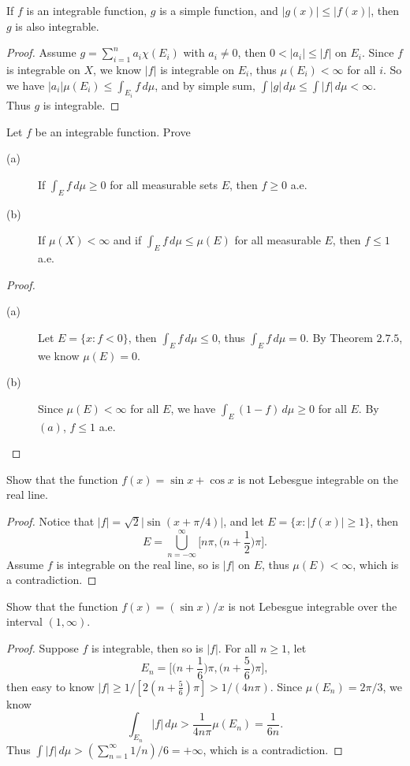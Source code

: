 \begin{pro}%
	If $f$ is an integrable function, $g$ is a simple function, and $|g(x)|\leq |f(x)|$, then $g$ is also integrable.
\end{pro}
\begin{proof}
	Assume $g=\sum_{i=1}^n a_i\chi(E_i)$ with $a_i\neq 0$, then $0<|a_i|\leq |f|$ on $E_i$. Since $f$ is integrable on $X$, we know $|f|$ is integrable on $E_i$, thus $\mu(E_i)<\infty$ for all $i$. So we have $|a_i|\mu(E_i)\leq \int_{E_i} f\,d\mu$, and by simple sum, $\int |g|\,d\mu\leq\int |f|\,d\mu<\infty$. Thus $g$ is integrable.
\end{proof}

\begin{pro}%
	Let $f$ be an integrable function. Prove
	\begin{description}
	\item[(a)] If $\int_E f\,d\mu\geq 0$ for all measurable sets $E$, then $f\geq 0$ a.e.
	\item[(b)] If $\mu(X)<\infty$ and if $\int_E f\,d\mu\leq \mu(E)$ for all measurable $E$, then $f\leq 1$ a.e.
	\end{description}
\end{pro}
\begin{proof}
	\begin{description}
	\item[(a)] Let $E=\{x\colon f<0\}$, then $\int_E f\,d\mu\leq 0$, thus $\int_E f\,d\mu=0$. By Theorem $2.7.5$, we know $\mu(E)=0$.
	\item[(b)] Since $\mu(E)<\infty$ for all $E$, we have $\int_E (1-f)\,d\mu\geq 0$ for all $E$. By $(a)$, $f\leq 1$ a.e.
	\end{description}
\end{proof}

\begin{pro}%
	Show that the function $f(x)=\sin x+\cos x$ is not Lebesgue integrable on the real line.
\end{pro}
\begin{proof}
	Notice that $|f|=\sqrt{2}|\sin(x+\pi/4)|$, and let $E=\{x\colon |f(x)|\geq 1\}$, then
	\[E=\bigcup_{n=-\infty}^{\infty} \bigg[n\pi,\Big(n+\frac{1}{2}\Big)\pi\bigg].\]
	Assume $f$ is integrable on the real line, so is $|f|$ on $E$, thus $\mu(E)<\infty$, which is a contradiction.
\end{proof}

\begin{pro}%
	Show that the function $f(x)=(\sin x)/x$ is not Lebesgue integrable over the interval $(1,\infty)$.
\end{pro}
\begin{proof}
	Suppose $f$ is integrable, then so is $|f|$. For all $n\geq 1$, let
	\[E_n=\bigg[\Big(n+\frac{1}{6}\Big)\pi,\Big(n+\frac{5}{6}\Big)\pi\bigg],\]
	then easy to know $|f|\geq 1/[2(n+\frac{5}{6})\pi]>1/(4n\pi)$. Since $\mu(E_n)=2\pi/3$, we know
	\[\int_{E_n} |f|\,d\mu>\frac{1}{4n\pi}\mu(E_n)=\frac{1}{6n}.\]
	Thus $\int |f|\,d\mu> (\sum_{n=1}^\infty 1/n)/6=+\infty$, which is a contradiction.
\end{proof}

